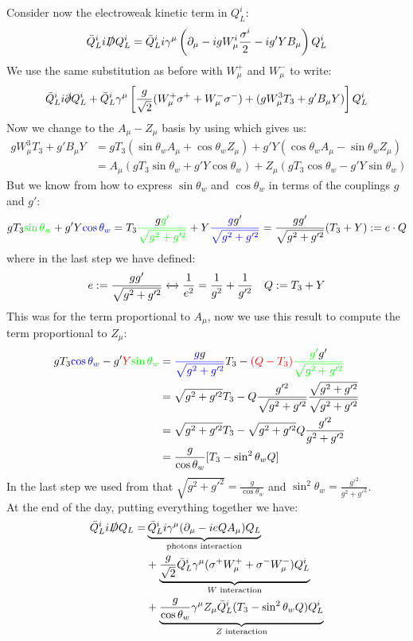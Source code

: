 \documentclass[../main.tex]{subfiles}
\begin{document}
Consider now the electroweak kinetic term in $Q_L^i$:
\[
\Bar{Q}_L^ii\slashed{D}Q_L^i=\Bar{Q}_L^ii\gamma^\mu\left(\partial_\mu-igW_\mu^i\frac{\sigma^i}{2}-ig'YB_\mu\right)Q_L^i
\]
We use the same substitution as before with $W_\mu^+$ and $W_\mu^-$ to write:
\[
\Bar{Q}_L^ii\slashed{\partial}Q_L^i+\Bar{Q}_L^i\gamma^\mu\left[\frac{g}{\sqrt{2}}(W_\mu^+\sigma^++W_\mu^-\sigma^-)+(gW_\mu^3T_3+g'B_\mu Y)\right]Q_L^i
\]
Now we change to the $A_\mu-Z_\mu$ basis by using  which gives us:
\begin{align*}
gW_\mu^3T_3+g'B_\mu Y&=gT_3(\sin\theta_wA_\mu+\cos\theta_wZ_\mu)+g'Y(\cos\theta_wA_\mu-\sin\theta_wZ_\mu)\\
&=A_\mu(gT_3\sin\theta_w+g'Y\cos\theta_w)+Z_\mu(gT_3\cos\theta_w-g'Y\sin\theta_w)
\end{align*}
But we know from  how to express $\sin\theta_w$ and $\cos\theta_w$ in terms of the couplings $g$ and $g'$:
\[
gT_3{\color{green}\sin\theta_w}+g'Y{\color{blue}\cos\theta_w}=T_3{\color{green}\frac{{\color{black}g}g'}{\sqrt{g^2+g'^2}}}+Y{\color{blue}\frac{g{\color{black}g'}}{\sqrt{g^2+g'^2}}}=\frac{gg'}{\sqrt{g^2+g'^2}}(T_3+Y):=e\cdot Q
\]
where in the last step we have defined:
\[
e:=\frac{gg'}{\sqrt{g^2+g'^2}}\xleftrightarrow[]{}\frac{1}{e^2}=\frac{1}{g^2}+\frac{1}{g'^2} \quad Q:=T_3+Y
\]
This was for the term proportional to $A_\mu$, now we use this result to compute the term proportional to $Z_\mu$:
\begin{align*}
gT_3{\color{blue}\cos\theta_w}-g'{\color{red}Y}{\color{green}\sin\theta_w}&={\color{blue}\frac{g{\color{black}g}}{\sqrt{g^2+g'^2}}}T_3-{\color{red}(Q-T_3)}{\color{green}\frac{g'{\color{black}g'}}{\sqrt{g^2+g'^2}}}\\
&=\sqrt{g^2+g'^2}T_3-Q\frac{g'^2}{\sqrt{g^2+g'^2}}\frac{\sqrt{g^2+g'^2}}{\sqrt{g^2+g'^2}}\\
&=\sqrt{g^2+g'^2}T_3-\sqrt{g^2+g'^2}Q\frac{g'^2}{g^2+g'^2}\\
&=\frac{g}{\cos\theta_w}[T_3-\sin^2\theta_wQ]
\end{align*}
In the last step we used from  that $\sqrt{g^2+g'^2}=\frac{g}{\cos\theta_w}$ and $\sin^2\theta_w=\frac{g'^2}{g^2+g'^2}$.\\
At the end of the day, putting everything together we have:
\begin{align*}
\Bar{Q}_L^ii\slashed{D}Q_L=&\underbrace{\Bar{Q}_L^ii\gamma^\mu(\partial_\mu-ieQA_\mu)Q_L}_{\text{photons interaction}}\\
&+\underbrace{\frac{g}{\sqrt{2}}\Bar{Q}_L^i\gamma^\mu(\sigma^+W_\mu^++\sigma^-W_\mu^-)Q_L^i}_{\text{$W$ interaction}}\\
&+\underbrace{\frac{g}{\cos\theta_w}\gamma^\mu Z_\mu\Bar{Q}_L^i(T_3-\sin^2\theta_wQ)Q_L^i}_{\text{$Z$ interaction}}
\end{align*}
\end{document}
